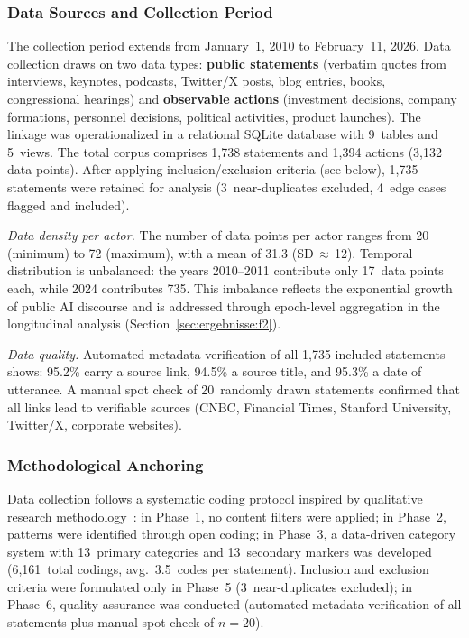 \documentclass[12pt,a4paper]{article}
\begin{document}
\subsubsection{Data Sources and Collection Period}

The collection period extends from January~1, 2010 to February~11, 2026. Data collection draws on two data types: \textbf{public statements} (verbatim quotes from interviews, keynotes, podcasts, Twitter/X posts, blog entries, books, congressional hearings) and \textbf{observable actions} (investment decisions, company formations, personnel decisions, political activities, product launches). The linkage was operationalized in a relational SQLite database with 9~tables and 5~views. The total corpus comprises 1,738 statements and 1,394 actions (3,132 data points). After applying inclusion/exclusion criteria (see below), 1,735 statements were retained for analysis (3~near-duplicates excluded, 4~edge cases flagged and included).

\emph{Data density per actor.} The number of data points per actor ranges from 20 (minimum) to 72 (maximum), with a mean of 31.3 (SD\,$\approx$\,12). Temporal distribution is unbalanced: the years 2010--2011 contribute only 17~data points each, while 2024 contributes 735. This imbalance reflects the exponential growth of public AI discourse and is addressed through epoch-level aggregation in the longitudinal analysis (Section~\ref{sec:ergebnisse:f2}).

\emph{Data quality.} Automated metadata verification of all 1,735 included statements shows: 95.2\% carry a source link, 94.5\% a source title, and 95.3\% a date of utterance. A manual spot check of 20~randomly drawn statements confirmed that all links lead to verifiable sources (CNBC, Financial Times, Stanford University, Twitter/X, corporate websites).

\subsubsection{Methodological Anchoring}

Data collection follows a systematic coding protocol inspired by qualitative research methodology~\citep{StraussCorbin1990}: in Phase~1, no content filters were applied; in Phase~2, patterns were identified through open coding; in Phase~3, a data-driven category system with 13~primary categories and 13~secondary markers was developed (6,161~total codings, avg.\ 3.5~codes per statement). Inclusion and exclusion criteria were formulated only in Phase~5 (3~near-duplicates excluded); in Phase~6, quality assurance was conducted (automated metadata verification of all statements plus manual spot check of $n = 20$).
\end{document}
